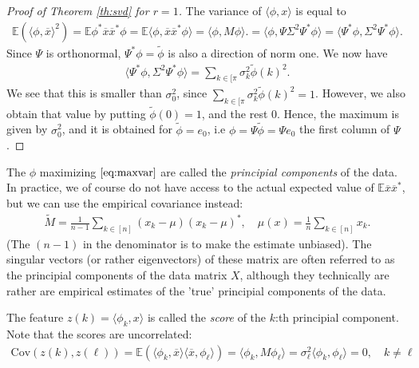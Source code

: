 \documentclass{article}
\newcommand{\erw}{\mathbb{E}} %
\newcommand{\sprod}[1]{\langle #1 \rangle}
\begin{document}
\begin{proof}[Proof of Theorem \ref{th:svd} for $r=1$] The variance of $\sprod{\phi,x}$ is equal to 
\begin{align*}
    \erw(\sprod{\phi, \overline{x}}^2) = \erw{\phi^*\overline{x}\overline{x}^*\phi} = \erw{\sprod{\phi,\overline{x}\overline{x}^*\phi}} = \sprod{\phi, M \phi}. = \sprod{\phi,\Psi\Sigma^2\Psi^*\phi} = \sprod{\Psi^*\phi,\Sigma^2\Psi^*\phi}.
\end{align*}
Since $\Psi$ is orthonormal, $\Psi^*\phi=\tilde{\phi}$  is also a direction of norm one. We now have
\begin{align*}
    \sprod{\Psi^*\phi,\Sigma^2\Psi^*\phi} = \sum_{k\in [\pi} \sigma_k^2\tilde{\phi}(k)^2.
\end{align*}
We see that this is smaller than $\sigma_0^2$, since $\sum_{k\in [\pi} \sigma_k^2\tilde{\phi}(k)^2=1$. However, we also obtain that value by putting $\tilde{\phi}(0)=1$, and the rest $0$. Hence, the maximum is given by $\sigma_0^2$, and it is obtained for $\tilde{\phi}=e_0$, i.e $\phi = \Psi \tilde{\phi} = \Psi e_0$ the first column of $\Psi$.
\end{proof}



The $\phi$ maximizing $\eqref{eq:maxvar}$ are called the \emph{principial components} of the data. In practice, we of course do not have access to the actual expected value of $\erw{\overline{x}\overline{x}^*}$, but we can use the empirical covariance instead:
\begin{align*}
  \tilde{M} = \frac{1}{n-1} \sum_{k\in [n]} (x_k - \mu)(x_k-\mu)^*, \quad  \mu(x) = \tfrac{1}{n} \sum_{k \in [n]} x_k.
\end{align*}
(The $(n-1)$ in the denominator is to make the estimate unbiased). The singular vectors (or rather eigenvectors) of these matrix are often referred to as the principial components of the data matrix $X$, although they technically are rather are empirical estimates of the 'true' principial components of the data.

The feature $z(k)=\sprod{\phi_k,x}$ is called the \emph{score} of the $k$:th principial component. Note that the scores are uncorrelated:
\begin{align*}
    \mathrm{Cov}(z(k),z(\ell)) = \mathbb{E}(\sprod{\phi_k,\overline{x}}\sprod{\overline{x},\phi_\ell}) = \sprod{\phi_k,M\phi_\ell} = \sigma_\ell^2 \sprod{\phi_k,\phi_\ell}=0, \quad k\neq \ell
\end{align*}
\end{document}
